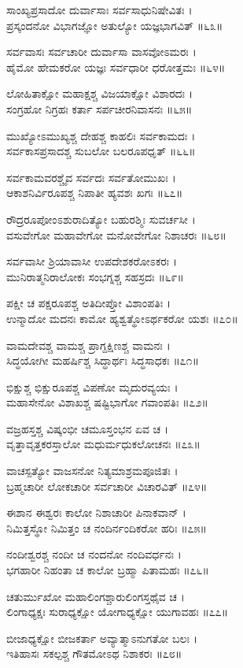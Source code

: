 ಸಾಂಖ್ಯಪ್ರಸಾದೋ ದುರ್ವಾಸಾಃ ಸರ್ವಸಾಧುನಿಷೇವಿತಃ ।\\
ಪ್ರಸ್ಕಂದನೋ ವಿಭಾಗಜ್ಞೋ ಅತುಲ್ಯೋ ಯಜ್ಞಭಾಗವಿತ್ ॥೬೩॥

ಸರ್ವವಾಸಃ ಸರ್ವಚಾರೀ ದುರ್ವಾಸಾ ವಾಸವೋಽಮರಃ ।\\
ಹೈಮೋ ಹೇಮಕರೋ ಯಜ್ಞಃ ಸರ್ವಧಾರೀ ಧರೋತ್ತಮಃ ॥೬೪॥

ಲೋಹಿತಾಕ್ಷೋ ಮಹಾಕ್ಷಶ್ಚ ವಿಜಯಾಕ್ಷೋ ವಿಶಾರದಃ ।\\
ಸಂಗ್ರಹೋ ನಿಗ್ರಹಃ ಕರ್ತಾ ಸರ್ಪಚೀರನಿವಾಸನಃ ॥೬೫॥

ಮುಖ್ಯೋಽಮುಖ್ಯಶ್ಚ ದೇಹಶ್ಚ ಕಾಹಲಿಃ ಸರ್ವಕಾಮದಃ ।\\
ಸರ್ವಕಾಸಪ್ರಸಾದಶ್ಚ ಸುಬಲೋ ಬಲರೂಪಧೃತ್ ॥೬೬॥

ಸರ್ವಕಾಮವರಶ್ಚೈವ ಸರ್ವದಃ ಸರ್ವತೋಮುಖಃ ।\\
ಆಕಾಶನಿರ್ವಿರೂಪಶ್ಚ ನಿಪಾತೀ ಹ್ಯವಶಃ ಖಗಃ ॥೬೭॥

ರೌದ್ರರೂಪೋಂಽಶುರಾದಿತ್ಯೋ ಬಹುರಶ್ಮಿಃ ಸುವರ್ಚಸೀ ।\\
ವಸುವೇಗೋ ಮಹಾವೇಗೋ ಮನೋವೇಗೋ ನಿಶಾಚರಃ ॥೬೮॥

ಸರ್ವವಾಸೀ ಶ್ರಿಯಾವಾಸೀ ಉಪದೇಶಕರೋಽಕರಃ ।\\
ಮುನಿರಾತ್ಮನಿರಾಲೋಕಃ ಸಂಭಗ್ನಶ್ಚ ಸಹಸ್ರದಃ ॥೬೯॥

ಪಕ್ಷೀ ಚ ಪಕ್ಷರೂಪಶ್ಚ ಅತಿದೀಪ್ತೋ ವಿಶಾಂಪತಿಃ ।\\
ಉನ್ಮಾದೋ ಮದನಃ ಕಾಮೋ ಹ್ಯಶ್ವತ್ಥೋಽರ್ಥಕರೋ ಯಶಃ ॥೭೦॥

ವಾಮದೇವಶ್ಚ ವಾಮಶ್ಚ ಪ್ರಾಗ್ದಕ್ಷಿಣಶ್ಚ ವಾಮನಃ ।\\
ಸಿದ್ಧಯೋಗೀ ಮಹರ್ಷಿಶ್ಚ ಸಿದ್ಧಾರ್ಥಃ ಸಿದ್ಧಸಾಧಕಃ ॥೭೧॥

ಭಿಕ್ಷುಶ್ಚ ಭಿಕ್ಷುರೂಪಶ್ಚ ವಿಪಣೋ ಮೃದುರವ್ಯಯಃ ।\\
ಮಹಾಸೇನೋ ವಿಶಾಖಶ್ಚ ಷಷ್ಟಿಭಾಗೋ ಗವಾಂಪತಿಃ ॥೭೨॥

ವಜ್ರಹಸ್ತಶ್ಚ ವಿಷ್ಕಂಭೀ ಚಮೂಸ್ತಂಭನ ಏವ ಚ ।\\
ವೃತ್ತಾವೃತ್ತಕರಸ್ತಾಲೋ ಮಧುರ್ಮಧುಕಲೋಚನಃ ॥೭೩॥

ವಾಚಸ್ಪತ್ಯೋ ವಾಜಸನೋ ನಿತ್ಯಮಾಶ್ರಮಪೂಜಿತಃ ।\\
ಬ್ರಹ್ಮಚಾರೀ ಲೋಕಚಾರೀ ಸರ್ವಚಾರೀ ವಿಚಾರವಿತ್ ॥೭೪॥

ಈಶಾನ ಈಶ್ವರಃ ಕಾಲೋ ನಿಶಾಚಾರೀ ಪಿನಾಕವಾನ್ ।\\
ನಿಮಿತ್ತಸ್ಥೋ ನಿಮಿತ್ತಂ ಚ ನಂದಿರ್ನಂದಿಕರೋ ಹರಿಃ ॥೭೫॥

ನಂದೀಶ್ವರಶ್ಚ ನಂದೀ ಚ ನಂದನೋ ನಂದಿವರ್ಧನಃ ।\\
ಭಗಹಾರೀ ನಿಹಂತಾ ಚ ಕಾಲೋ ಬ್ರಹ್ಮಾ ಪಿತಾಮಹಃ ॥೭೬॥

ಚತುರ್ಮುಖೋ ಮಹಾಲಿಂಗಶ್ಚಾರುಲಿಂಗಸ್ತಥೈವ ಚ ।\\
ಲಿಂಗಾಧ್ಯಕ್ಷಃ ಸುರಾಧ್ಯಕ್ಷೋ ಯೋಗಾಧ್ಯಕ್ಷೋ ಯುಗಾವಹಃ ॥೭೭॥

ಬೀಜಾಧ್ಯಕ್ಷೋ ಬೀಜಕರ್ತಾ ಅವ್ಯಾತ್ಮಾಽನುಗತೋ ಬಲಃ ।\\
ಇತಿಹಾಸಃ ಸಕಲ್ಪಶ್ಚ ಗೌತಮೋಽಥ ನಿಶಾಕರಃ ॥೭೮॥

